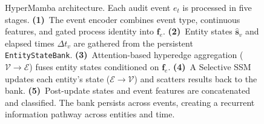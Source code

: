 \begin{figure}[t]
{\begin{tikzpicture}
\end{tikzpicture}%
}
\caption{HyperMamba architecture. Each audit event $e_t$ is processed in five stages. \textbf{(1)}~The event encoder combines event type, continuous features, and gated process identity into $\mathbf{f}_e$. \textbf{(2)}~Entity states $\hat{\mathbf{s}}_v$ and elapsed times $\Delta t_v$ are gathered from the persistent \texttt{EntityStateBank}. \textbf{(3)}~Attention-based hyperedge aggregation ($\mathcal{V} \to \mathcal{E}$) fuses entity states conditioned on $\mathbf{f}_e$. \textbf{(4)}~A Selective SSM updates each entity's state ($\mathcal{E} \to \mathcal{V}$) and scatters results back to the bank. \textbf{(5)}~Post-update states and event features are concatenated and classified. The bank persists across events, creating a recurrent information pathway across entities and time.}
\label{fig:architecture}
\end{figure}
